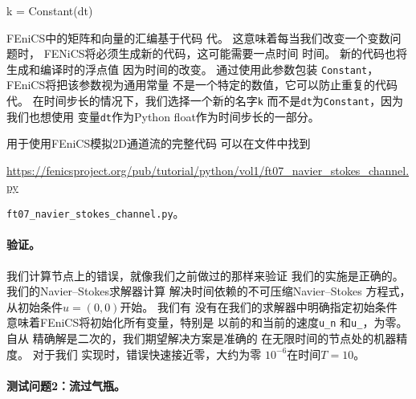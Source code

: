 \begin{python}
k = Constant(dt)
\end{python}

FEniCS中的矩阵和向量的汇编基于代码
代。 这意味着每当我们改变一个变数问题时，
FENiCS将必须生成新的代码，这可能需要一点时间
时间。 新的代码也将生成和编译时的浮点值
因为时间的改变。 通过使用此参数包装
\texttt{Constant}，FEniCS将把该参数视为通用常量
不是一个特定的数值，它可以防止重复的代码
代。 在时间步长的情况下，我们选择一个新的名字\texttt{k}
而不是\texttt{dt}为\texttt{Constant}，因为我们也想使用
变量\texttt{dt}作为Python float作为时间步长的一部分。

用于使用FEniCS模拟2D通道流的完整代码
可以在文件中找到
\begin{center}
  \url{https://fenicsproject.org/pub/tutorial/python/vol1/ft07_navier_stokes_channel.py}
\end{center}
\begin{center}
  \nolinkurl{ft07_navier_stokes_channel.py}。
\end{center}


\paragraph{验证。}

我们计算节点上的错误，就像我们之前做过的那样来验证
我们的实施是正确的。 我们的Navier--Stokes求解器计算
解决时间依赖的不可压缩Navier--Stokes
方程式，从初始条件$u =(0, 0)$开始。 我们有
没有在我们的求解器中明确指定初始条件
意味着FEniCS将初始化所有变量，特别是
以前的和当前的速度\verb!u_n! 和\verb!u_!，为零。 自从
精确解是二次的，我们期望解决方案是准确的
在无限时间的节点处的机器精度。 对于我们
实现时，错误快速接近零，大约为零
$10^{-6}$在时间$T = 10$。


\paragraph{测试问题2：流过气瓶。}

